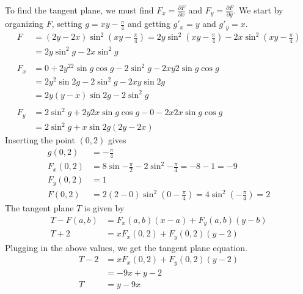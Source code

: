 \documentclass[a4paper,norsk,12pt]{article}
\begin{document}
To find the tangent plane, we must find $F_x = \frac{\partial F}{\partial x}$
and $F_y = \frac{\partial F}{\partial y}$. We start by organizing $F$, setting
$g=xy-\frac{\pi}{4}$ and getting $g'_x=y$ and $g'_y=x$.
%
\begin{align*}
  F &= (2y-2x)\sin^2{(xy-\frac{\pi}{4})}
      = 2y\sin^2{(xy-\frac{\pi}{4})} - 2x\sin^2{(xy-\frac{\pi}{4})} \\
      &= 2y\sin^2{g}-2x\sin^2{g} \\
\\
  F_x &= 0+2y^22\sin{g}\cos{g} -2\sin^2{g} - 2xy2\sin{g}\cos{g} \\
      &= 2y^2\sin{2g} - 2\sin^2{g} - 2xy\sin{2g} \\
      &= 2y(y-x)\sin{2g} - 2\sin^2{g} \\
\\
  F_y &= 2\sin^2{g} + 2y2x\sin{g}\cos{g} - 0 - 2x2x\sin{g}\cos{g} \\
      &= 2\sin^2{g} + x\sin{2g}(2y-2x)
\end{align*}
Inserting the point $(0,2)$ gives
\begin{align*}
  g(0,2) &= -\frac{\pi}{4} \\
  F_x(0,2) &= 8\sin{-\frac{\pi}{2}} - 2\sin^2{-\frac{\pi}{4}} = -8-1 = -9 \\
  F_y(0,2) &= 1 \\
  F(0,2) &= 2(2-0)\sin^2{(0-\frac{\pi}{4})} = 4\sin^2{(-\frac{\pi}{4})} = 2
\end{align*}
The tangent plane $T$ is given by
\begin{align*}
  T - F(a,b) &= F_x(a,b)(x-a) + F_y(a,b)(y-b) \\
  T + 2 &= xF_x(0,2) + F_y(0,2)(y-2)
\end{align*}
Plugging in the above values, we get the tangent plane equation.
\begin{align*}
  T - 2 &= xF_x(0,2) + F_y(0,2)(y-2) \\
        &= -9x + y - 2 \\
  T &= y-9x
\end{align*}
\end{document}
